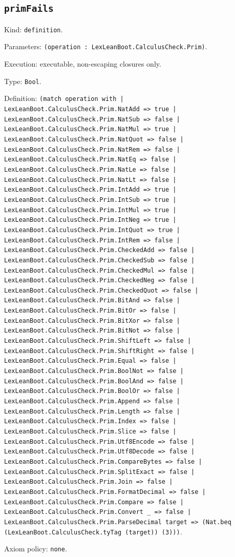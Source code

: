 \documentclass[11pt]{article}
\begin{document}
\subsection*{\texttt{primFails}}
\noindent Kind: \texttt{definition}.\par
\noindent Parameters: \texttt{(operation : LexLeanBoot.CalculusCheck.Prim)}.\par
\noindent Execution: executable, non-escaping closures only.\par
\noindent Type: \texttt{Bool}.\par
\noindent Definition: \texttt{(match operation with | LexLeanBoot.CalculusCheck.Prim.NatAdd => true | LexLeanBoot.CalculusCheck.Prim.NatSub => false | LexLeanBoot.CalculusCheck.Prim.NatMul => true | LexLeanBoot.CalculusCheck.Prim.NatQuot => false | LexLeanBoot.CalculusCheck.Prim.NatRem => false | LexLeanBoot.CalculusCheck.Prim.NatEq => false | LexLeanBoot.CalculusCheck.Prim.NatLe => false | LexLeanBoot.CalculusCheck.Prim.NatLt => false | LexLeanBoot.CalculusCheck.Prim.IntAdd => true | LexLeanBoot.CalculusCheck.Prim.IntSub => true | LexLeanBoot.CalculusCheck.Prim.IntMul => true | LexLeanBoot.CalculusCheck.Prim.IntNeg => true | LexLeanBoot.CalculusCheck.Prim.IntQuot => true | LexLeanBoot.CalculusCheck.Prim.IntRem => false | LexLeanBoot.CalculusCheck.Prim.CheckedAdd => false | LexLeanBoot.CalculusCheck.Prim.CheckedSub => false | LexLeanBoot.CalculusCheck.Prim.CheckedMul => false | LexLeanBoot.CalculusCheck.Prim.CheckedNeg => false | LexLeanBoot.CalculusCheck.Prim.CheckedQuot => false | LexLeanBoot.CalculusCheck.Prim.BitAnd => false | LexLeanBoot.CalculusCheck.Prim.BitOr => false | LexLeanBoot.CalculusCheck.Prim.BitXor => false | LexLeanBoot.CalculusCheck.Prim.BitNot => false | LexLeanBoot.CalculusCheck.Prim.ShiftLeft => false | LexLeanBoot.CalculusCheck.Prim.ShiftRight => false | LexLeanBoot.CalculusCheck.Prim.Equal => false | LexLeanBoot.CalculusCheck.Prim.BoolNot => false | LexLeanBoot.CalculusCheck.Prim.BoolAnd => false | LexLeanBoot.CalculusCheck.Prim.BoolOr => false | LexLeanBoot.CalculusCheck.Prim.Append => false | LexLeanBoot.CalculusCheck.Prim.Length => false | LexLeanBoot.CalculusCheck.Prim.Index => false | LexLeanBoot.CalculusCheck.Prim.Slice => false | LexLeanBoot.CalculusCheck.Prim.Utf8Encode => false | LexLeanBoot.CalculusCheck.Prim.Utf8Decode => false | LexLeanBoot.CalculusCheck.Prim.CompareBytes => false | LexLeanBoot.CalculusCheck.Prim.SplitExact => false | LexLeanBoot.CalculusCheck.Prim.Join => false | LexLeanBoot.CalculusCheck.Prim.FormatDecimal => false | LexLeanBoot.CalculusCheck.Prim.Compare => false | LexLeanBoot.CalculusCheck.Prim.Convert \_ => false | LexLeanBoot.CalculusCheck.Prim.ParseDecimal target => (Nat.beq (LexLeanBoot.CalculusCheck.tyTag (target)) (3)))}.\par
\noindent Axiom policy: \texttt{none}.\par
\end{document}
